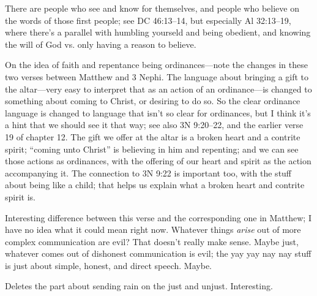 		\begin{compactdesc}
		
		\item[1--2$\vert$]
		\begin{compactdesc}
		\item[see and know/believe on words] There are people who see and know for themselves, and people who believe on the words of those first people; see DC 46:13--14, but especially Al 32:13--19, where there's a parallel with humbling yourseld and being obedient, and knowing the will of God vs. only having a reason to believe.
		\end{compactdesc}
		
		\item[23--24$\vert$]
		\begin{compactdesc}
		\item[Differences in Matthew] On the idea of faith and repentance being ordinances---note the changes in these two verses between Matthew and 3 Nephi. The language about bringing a gift to the altar---very easy to interpret that as an action of an ordinance---is changed to something about coming to Christ, or desiring to do so. So the clear ordinance language is changed to language that isn't so clear for ordinances, but I think it's a hint that we should see it that way; see also 3N 9:20--22, and the earlier verse 19 of chapter 12. The gift we offer at the altar is a broken heart and a contrite spirit; ``coming unto Christ'' is believing in him and repenting; and we can see those actions as ordinances, with the offering of our heart and spirit as the action accompanying it. The connection to 3N 9:22 is important too, with the stuff about being like a child; that helps us explain what a broken heart and contrite spirit is.
		\end{compactdesc}
		
		\item[37$\vert$]
		\begin{compactdesc}
		\item[cometh of more] Interesting difference between this verse and the corresponding one in Matthew; I have no idea what it could mean right now. Whatever things \textit{arise} out of more complex communication are evil? That doesn't really make sense. Maybe just, whatever comes out of dishonest communication is evil; the yay yay nay nay stuff is just about simple, honest, and direct speech. Maybe.
		\end{compactdesc}
		
		\item[45$\vert$]
		\begin{compactdesc}
		\item[Difference with Matthew] Deletes the part about sending rain on the just and unjust. Interesting.
		\end{compactdesc}
		

\end{compactdesc}
